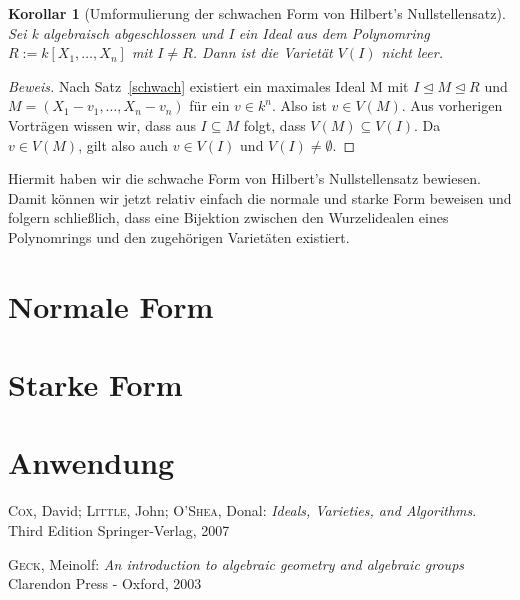 \documentclass{article}
\newtheorem{korollar}[satz]{Korollar}
\begin{document}
	\begin{korollar}[Umformulierung der schwachen Form von Hilbert's Nullstellensatz]
	Sei k algebraisch abgeschlossen und I ein Ideal aus dem Polynomring \(R :=
	k[X_1,\ldots,X_n]\) mit \(I \neq R\). Dann ist die Varietät \(V(I)\) nicht leer.
	\end{korollar}

	\begin{proof}[Beweis]
	Nach Satz~\ref{schwach} existiert ein maximales Ideal M mit \(I \unlhd M \unlhd R\)
	und \(M = (X_1 - v_1, \ldots, X_n - v_n)\) für ein \(v \in k^n\). Also ist
	\(v \in V(M)\). Aus vorherigen Vorträgen wissen wir, dass aus \(I \subseteq M\) folgt,
	dass \(V(M) \subseteq V(I)\). Da \(v \in V(M)\), gilt also auch \(v \in V(I)\)
	und \(V(I) \neq \emptyset\).
	\end{proof}

	Hiermit haben wir die schwache Form von Hilbert's Nullstellensatz bewiesen. Damit können wir jetzt relativ einfach die normale und starke Form beweisen und folgern schließlich, dass eine Bijektion zwischen den Wurzelidealen eines Polynomrings und den zugehörigen Varietäten existiert.

\section{Normale Form}
\section{Starke Form}
\section{Anwendung}

\begin{thebibliography}{99}
	\textsc{Cox}, David; \textsc{Little}, John; \textsc{O'Shea}, Donal:
	\newblock \emph{Ideals, Varieties, and Algorithms}.
	\newblock Third Edition
	\newblock Springer-Verlag, 2007
	
	\textsc{Geck}, Meinolf:
	\newblock \emph{An introduction to algebraic geometry and algebraic groups}
	\newblock Clarendon Press - Oxford, 2003
\end{thebibliography}
\end{document}
